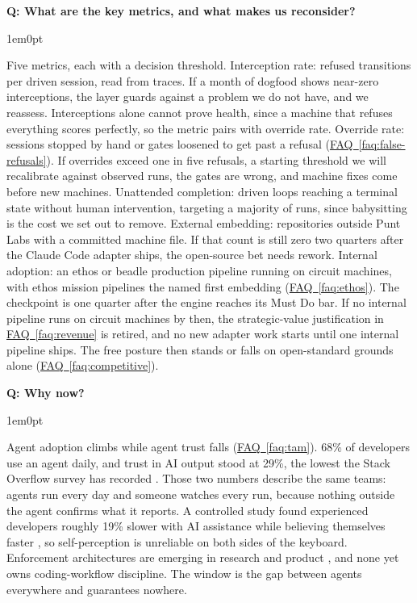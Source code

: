 \documentclass[11pt,letterpaper]{article}
\newcounter{faqnum}
\newenvironment{faqpair}[1]{%
  \needspace{4\baselineskip}%
  \vspace{0.5em}%
  \refstepcounter{faqnum}%
  \noindent\textbf{\color{SectionBlue}Q\thefaqnum: #1}\par\nopagebreak[4]%
  \vspace{0.2em}%
  \begin{adjustwidth}{1em}{0pt}%
  \setlength{\parindent}{0pt}%
}{%
  \end{adjustwidth}%
  \vspace{0.5em}%
}
\newcommand{\faqref}[1]{\hyperref[#1]{FAQ~\ref*{#1}}}
\begin{document}
\begin{faqpair}{What are the key metrics, and what makes us reconsider?}
\label{faq:metrics}
  Five metrics, each with a decision threshold. Interception rate: refused transitions per driven session, read from traces. If a month of dogfood shows near-zero interceptions, the layer guards against a problem we do not have, and we reassess. Interceptions alone cannot prove health, since a machine that refuses everything scores perfectly, so the metric pairs with override rate. Override rate: sessions stopped by hand or gates loosened to get past a refusal (\faqref{faq:false-refusals}). If overrides exceed one in five refusals, a starting threshold we will recalibrate against observed runs, the gates are wrong, and machine fixes come before new machines. Unattended completion: driven loops reaching a terminal state without human intervention, targeting a majority of runs, since babysitting is the cost we set out to remove. External embedding: repositories outside Punt Labs with a committed machine file. If that count is still zero two quarters after the Claude Code adapter ships, the open-source bet needs rework. Internal adoption: an ethos or beadle production pipeline running on circuit machines, with ethos mission pipelines the named first embedding (\faqref{faq:ethos}). The checkpoint is one quarter after the engine reaches its Must Do bar. If no internal pipeline runs on circuit machines by then, the strategic-value justification in \faqref{faq:revenue} is retired, and no new adapter work starts until one internal pipeline ships. The free posture then stands or falls on open-standard grounds alone (\faqref{faq:competitive}).
\end{faqpair}

\begin{faqpair}{Why now?}
\label{faq:why-now}
  Agent adoption climbs while agent trust falls (\faqref{faq:tam}). 68\% of developers use an agent daily, and trust in AI output stood at 29\%, the lowest the Stack Overflow survey has recorded \cite{jetbrains2026agenttrends,stackoverflow2025survey}. Those two numbers describe the same teams: agents run every day and someone watches every run, because nothing outside the agent confirms what it reports. A controlled study found experienced developers roughly 19\% slower with AI assistance while believing themselves faster \cite{metr2025productivity}, so self-perception is unreliable on both sides of the keyboard. Enforcement architectures are emerging in research and product \cite{sharma2026ehv,sponsio2026}, and none yet owns coding-workflow discipline. The window is the gap between agents everywhere and guarantees nowhere.
\end{faqpair}
\end{document}
